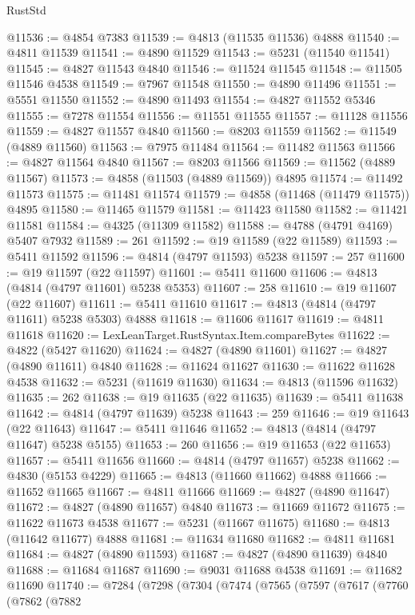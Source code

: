 \begin{lexlean}{RustStd}
\begin{coremodule}
@11536 := @4854 @7383
@11539 := @4813 (@11535 @11536) @4888
@11540 := @4811 @11539
@11541 := @4890 @11529
@11543 := @5231 (@11540 @11541)
@11545 := @4827 @11543 @4840
@11546 := @11524 @11545
@11548 := @11505 @11546 @4538
@11549 := @7967 @11548
@11550 := @4890 @11496
@11551 := @5551 @11550
@11552 := @4890 @11493
@11554 := @4827 @11552 @5346
@11555 := @7278 @11554
@11556 := @11551 @11555
@11557 := @11128 @11556
@11559 := @4827 @11557 @4840
@11560 := @8203 @11559
@11562 := @11549 (@4889 @11560)
@11563 := @7975 @11484
@11564 := @11482 @11563
@11566 := @4827 @11564 @4840
@11567 := @8203 @11566
@11569 := @11562 (@4889 @11567)
@11573 := @4858 (@11503 (@4889 @11569)) @4895
@11574 := @11492 @11573
@11575 := @11481 @11574
@11579 := @4858 (@11468 (@11479 @11575)) @4895
@11580 := @11465 @11579
@11581 := @11423 @11580
@11582 := @11421 @11581
@11584 := @4325 (@11309 @11582)
@11588 := @4788 (@4791 @4169) @5407 @7932
@11589 := 261
@11592 := @19 @11589 (@22 @11589)
@11593 := @5411 @11592
@11596 := @4814 (@4797 @11593) @5238
@11597 := 257
@11600 := @19 @11597 (@22 @11597)
@11601 := @5411 @11600
@11606 := @4813 (@4814 (@4797 @11601) @5238 @5353)
@11607 := 258
@11610 := @19 @11607 (@22 @11607)
@11611 := @5411 @11610
@11617 := @4813 (@4814 (@4797 @11611) @5238 @5303) @4888
@11618 := @11606 @11617
@11619 := @4811 @11618
@11620 := LexLeanTarget.RustSyntax.Item.compareBytes
@11622 := @4822 (@5427 @11620)
@11624 := @4827 (@4890 @11601)
@11627 := @4827 (@4890 @11611) @4840
@11628 := @11624 @11627
@11630 := @11622 @11628 @4538
@11632 := @5231 (@11619 @11630)
@11634 := @4813 (@11596 @11632)
@11635 := 262
@11638 := @19 @11635 (@22 @11635)
@11639 := @5411 @11638
@11642 := @4814 (@4797 @11639) @5238
@11643 := 259
@11646 := @19 @11643 (@22 @11643)
@11647 := @5411 @11646
@11652 := @4813 (@4814 (@4797 @11647) @5238 @5155)
@11653 := 260
@11656 := @19 @11653 (@22 @11653)
@11657 := @5411 @11656
@11660 := @4814 (@4797 @11657) @5238
@11662 := @4830 (@5153 @4229)
@11665 := @4813 (@11660 @11662) @4888
@11666 := @11652 @11665
@11667 := @4811 @11666
@11669 := @4827 (@4890 @11647)
@11672 := @4827 (@4890 @11657) @4840
@11673 := @11669 @11672
@11675 := @11622 @11673 @4538
@11677 := @5231 (@11667 @11675)
@11680 := @4813 (@11642 @11677) @4888
@11681 := @11634 @11680
@11682 := @4811 @11681
@11684 := @4827 (@4890 @11593)
@11687 := @4827 (@4890 @11639) @4840
@11688 := @11684 @11687
@11690 := @9031 @11688 @4538
@11691 := @11682 @11690
@11740 := @7284
    (@7298
      (@7304
        (@7474
          (@7565
            (@7597
              (@7617
                (@7760
                  (@7862
                    (@7882

\end{coremodule}
\end{lexlean}
